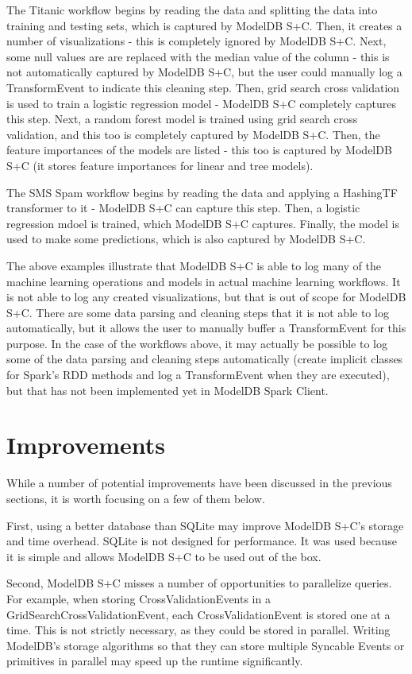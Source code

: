 The Titanic workflow begins by reading the data and splitting the data into training and testing sets, which is captured by
ModelDB S+C. Then, it creates a number of visualizations - this is completely ignored by ModelDB S+C.
Next, some null values are are replaced with the median value of the column - this is not automatically 
captured by ModelDB S+C, but the user could manually log a TransformEvent to indicate this cleaning step.
Then, grid search cross validation is used to train a logistic regression model - ModelDB S+C completely 
captures this step. Next, a random forest model is trained using grid search cross validation, and this too
is completely captured by ModelDB S+C. Then, the feature importances of the models are listed - this too
is captured by ModelDB S+C (it stores feature importances for linear and tree models).

The SMS Spam workflow begins by reading the data and applying a HashingTF transformer to it - ModelDB S+C
can capture this step. Then, a logistic regression mdoel is trained, which ModelDB S+C captures. Finally,
the model is used to make some predictions, which is also captured by ModelDB S+C.

The above examples illustrate that ModelDB S+C is able to log many of the machine learning operations and 
models in actual machine learning workflows. It is not able to log any created visualizations, but that is out
of scope for ModelDB S+C. There are some data parsing and cleaning steps that it is not able to log automatically, but
it allows the user to manually buffer a TransformEvent for this purpose. In the case of the workflows above, it
may actually be possible to log some of the data parsing and cleaning steps automatically (create implicit classes for
Spark's RDD methods and log a TransformEvent when they are executed), but that has not been
implemented yet in ModelDB Spark Client.

\section{Improvements}
While a number of potential improvements have been discussed in the previous sections,
it is worth focusing on a few of them below.

First, using a better database than SQLite may improve ModelDB S+C's storage and time
overhead. SQLite is not designed for performance. It was used because it is simple and allows
ModelDB S+C to be used out of the box.

Second, ModelDB S+C misses a number of opportunities to parallelize queries. For example,
when storing CrossValidationEvents in a GridSearchCrossValidationEvent, each CrossValidationEvent
is stored one at a time. This is not strictly necessary, as they could be stored in parallel.
Writing ModelDB's storage algorithms so that they can store multiple Syncable Events or primitives 
in parallel may speed up the runtime significantly.

